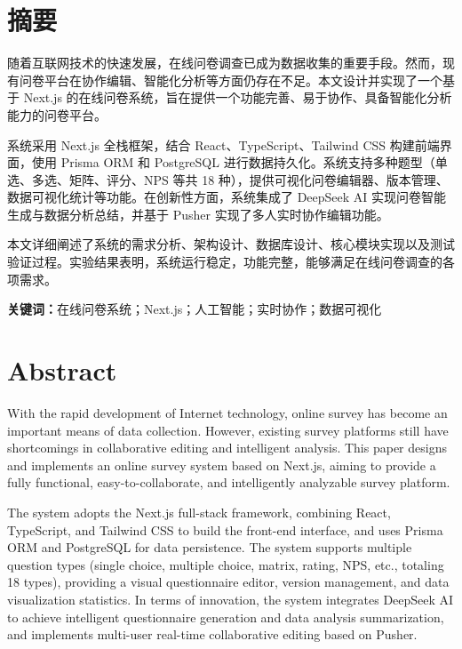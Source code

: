 \setcounter{page}{1}

\section*{摘\quad 要}

随着互联网技术的快速发展，在线问卷调查已成为数据收集的重要手段。然而，现有问卷平台在协作编辑、智能化分析等方面仍存在不足。本文设计并实现了一个基于 Next.js 的在线问卷系统，旨在提供一个功能完善、易于协作、具备智能化分析能力的问卷平台。

系统采用 Next.js 全栈框架，结合 React、TypeScript、Tailwind CSS 构建前端界面，使用 Prisma ORM 和 PostgreSQL 进行数据持久化。系统支持多种题型（单选、多选、矩阵、评分、NPS 等共 18 种），提供可视化问卷编辑器、版本管理、数据可视化统计等功能。在创新性方面，系统集成了 DeepSeek AI 实现问卷智能生成与数据分析总结，并基于 Pusher 实现了多人实时协作编辑功能。

本文详细阐述了系统的需求分析、架构设计、数据库设计、核心模块实现以及测试验证过程。实验结果表明，系统运行稳定，功能完整，能够满足在线问卷调查的各项需求。

\vspace{1em}
\noindent\textbf{关键词：}在线问卷系统；Next.js；人工智能；实时协作；数据可视化

\newpage

\section*{Abstract}

With the rapid development of Internet technology, online survey has become an important means of data collection. However, existing survey platforms still have shortcomings in collaborative editing and intelligent analysis. This paper designs and implements an online survey system based on Next.js, aiming to provide a fully functional, easy-to-collaborate, and intelligently analyzable survey platform.

The system adopts the Next.js full-stack framework, combining React, TypeScript, and Tailwind CSS to build the front-end interface, and uses Prisma ORM and PostgreSQL for data persistence. The system supports multiple question types (single choice, multiple choice, matrix, rating, NPS, etc., totaling 18 types), providing a visual questionnaire editor, version management, and data visualization statistics. In terms of innovation, the system integrates DeepSeek AI to achieve intelligent questionnaire generation and data analysis summarization, and implements multi-user real-time collaborative editing based on Pusher.

